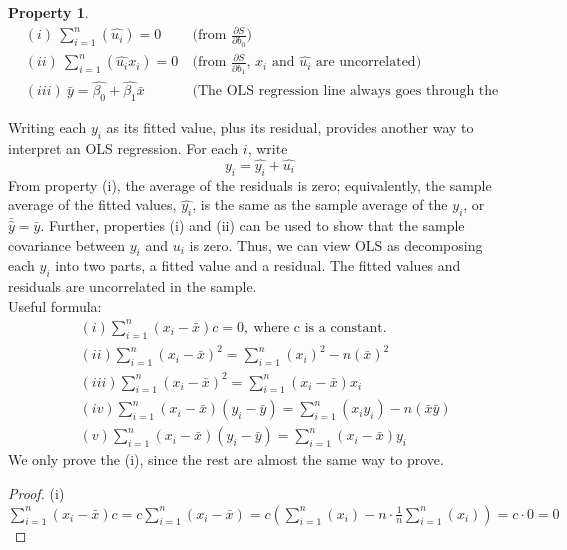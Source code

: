 \documentclass[a4paper, 10pt]{article}
\theoremstyle{definition}	%
\newtheorem{property}{Property}
\begin{document}
\begin{property}
    \begin{align*}
        &(i)\ \sum_{i=1}^{n} \left(\hat{u_i}\right) = 0 \ 
        &\text{(from $\frac{\partial S}{\partial b_0} $)}\\
        &(ii)\ \sum_{i=1}^{n} \left(\hat{u_i}x_i\right) = 0 \
        &\text{(from $\frac{\partial S}{\partial b_1} $, $x_i$ and $\hat{u_i}$ are uncorrelated)}\\
        &(iii)\ \bar{y} = \hat{\beta_0} + \hat{\beta_1} \bar{x} \ 
        &\text{(The OLS regression line always goes through the mean of the sample.)}
    \end{align*}
\end{property}  
Writing each $y_i$ as its fitted value, plus its residual, provides another way to interpret an OLS regression. For each $i$, write
\begin{equation*}
    y_i = \hat{y_i} + \hat{u_i}
\end{equation*}
From property (i), the average of the residuals is zero; equivalently, the sample average of the fitted values, $\hat{y_i}$, is the same as the sample average of the $y_i$, or $\bar{\hat{y}} = \bar{y}$. Further, properties (i) and (ii) can be used to show that the sample covariance between $y_i$ and $u_i$ is zero. Thus, we can view OLS as decomposing each $y_i$ into two parts, a fitted value and a residual. The fitted values and residuals are uncorrelated in the sample.\\
Useful formula:
\begin{align*}
    &(i)\sum_{i=1}^{n} (x_i - \bar{x}) c = 0,\ \text{where c is a constant.}\\
    &(ii)\sum_{i=1}^{n} (x_i - \bar{x})^2 = \sum_{i=1}^{n} (x_i)^2 - n (\bar{x})^2\\
    &(iii)\sum_{i=1}^{n} (x_i - \bar{x})^2 = \sum_{i=1}^{n} (x_i - \bar{x}) x_i\\
    &(iv)\sum_{i=1}^{n} (x_i - \bar{x})(y_i - \bar{y}) = \sum_{i=1}^{n} (x_i y_i) - n (\bar{x} \bar{y})\\
    &(v)\sum_{i=1}^{n} (x_i - \bar{x})(y_i - \bar{y}) = \sum_{i=1}^{n} (x_i - \bar{x}) y_i
\end{align*}
We only prove the (i), since the rest are almost the same way to prove.
\begin{proof}
    (i)\ $\sum_{i=1}^{n} (x_i - \bar{x}) c = c \sum_{i=1}^{n} (x_i - \bar{x}) = c \left(\sum_{i=1}^{n} (x_i) - n \cdot \frac{1}{n} \sum_{i=1}^{n} (x_i) \right)= c \cdot 0 = 0 $  
\end{proof}
\end{document}
